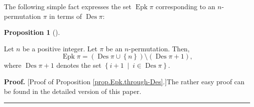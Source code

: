 \documentclass[numbers=enddot,12pt,final,onecolumn,notitlepage]{scrartcl}%
\theoremstyle{definition}
\newtheorem{prop}[theo]{Proposition}
\newenvironment{proposition}[1][]
{\begin{prop}[#1]\begin{leftbar}}
{\end{leftbar}\end{prop}}
\newenvironment{proof}[1][Proof]{\noindent\textbf{#1.} }{\ \rule{0.5em}{0.5em}}
\newenvironment{vershort}{}{}
\begin{document}
The following simple fact expresses the set $\operatorname*{Epk}\pi$
corresponding to an $n$-permutation $\pi$ in terms of $\operatorname*{Des}\pi$:

\begin{proposition}
\label{prop.Epk.through-Des}Let $n$ be a positive integer. Let $\pi$ be an
$n$-permutation. Then,%
\[
\operatorname*{Epk}\pi=\left(  \operatorname*{Des}\pi\cup\left\{  n\right\}
\right)  \setminus\left(  \operatorname*{Des}\pi+1\right)  ,
\]
where $\operatorname*{Des}\pi+1$ denotes the set $\left\{  i+1\ \mid
\ i\in\operatorname*{Des}\pi\right\}  $.
\end{proposition}

\begin{vershort}
\begin{proof}
[Proof of Proposition \ref{prop.Epk.through-Des}.]The rather easy proof can be
found in the detailed version \cite{verlong} of this paper.
\end{proof}
\end{vershort}
\end{document}
